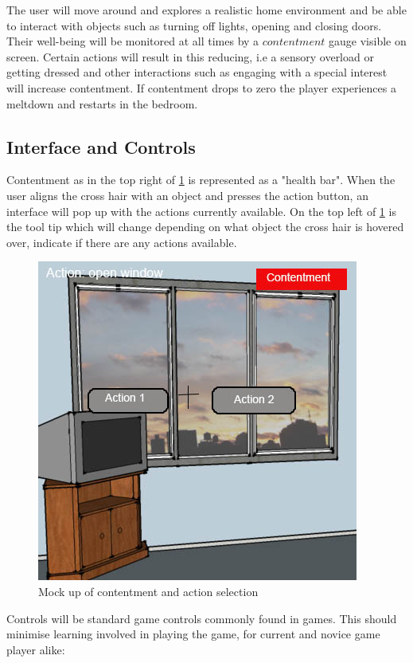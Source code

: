 \documentclass[11pt]{report}
\begin{document}
The user will move around and explores a realistic home environment and be able to interact with objects such as turning off lights, opening and closing doors. Their well-being will be monitored at all times by a $contentment$ gauge visible on screen. Certain actions will result in this reducing, i.e a sensory overload or getting dressed and other interactions such as engaging with a special interest will increase contentment. If contentment drops to zero the player experiences a meltdown and restarts in the bedroom. 

\subsection{Interface and Controls}

Contentment as in the top right of \ref{design_interface_actions} is represented as a "health bar". When the user aligns the cross hair with an object and presses the action button, an interface will pop up with the actions currently available. On the top left of \ref{design_interface_actions} is the tool tip which will change depending on what object the cross hair is hovered over, indicate if there are any actions available. 

\begin{figure}[H]
\centering
\includegraphics[scale=0.5]{images/design/interface_actions.jpg}
\caption{Mock up of contentment and action selection}
\label{design_interface_actions}
\end{figure}

Controls will be standard game controls commonly found in games. This should minimise learning involved in playing the game,  for current and novice game player alike: 
\end{document}
